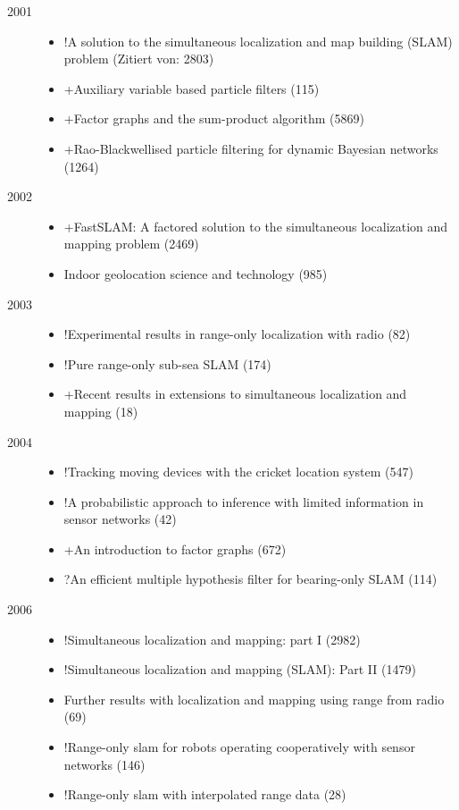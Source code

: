 \begin{description}

\item[2001]
\begin{itemize}
\item !A solution to the simultaneous localization and map building (SLAM) problem (Zitiert von: 2803)
\item +Auxiliary variable based particle filters (115)
\item +Factor graphs and the sum-product algorithm (5869)
\item +Rao-Blackwellised particle filtering for dynamic Bayesian networks (1264)
\end{itemize}

\item[2002]
\begin{itemize}
\item +FastSLAM: A factored solution to the simultaneous localization and mapping problem (2469)
\item Indoor geolocation science and technology (985)
\end{itemize}

\item[2003]
\begin{itemize}
\item !Experimental results in range-only localization with radio (82)
\item !Pure range-only sub-sea SLAM (174)
\item +Recent results in extensions to simultaneous localization and mapping (18)
\end{itemize}

\item[2004]
\begin{itemize}
\item !Tracking moving devices with the cricket location system (547)
\item !A probabilistic approach to inference with limited information in sensor networks (42)
\item +An introduction to factor graphs (672)
\item ?An efficient multiple hypothesis filter for bearing-only SLAM (114)
\end{itemize}

\item[2006]
\begin{itemize}
\item !Simultaneous localization and mapping: part I (2982)
\item !Simultaneous localization and mapping (SLAM): Part II (1479)
\item Further results with localization and mapping using range from radio (69)
\item !Range-only slam for robots operating cooperatively with sensor networks (146)
\item !Range-only slam with interpolated range data (28)
\end{itemize}


\end{description}
